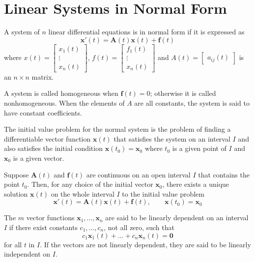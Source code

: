 \documentclass[../diffeq.tex]{subfiles}
\begin{document}
\section{Linear Systems in Normal Form}
A system of $n$ linear differential equations is in normal form if it is expressed as 
\[ \textbf{x}'(t)=\textbf{A}(t)\textbf{x}(t)+\textbf{f}(t) \]
where $x(t) = \begin{bmatrix}
    x_1(t)\\\vdots\\x_n(t)
\end{bmatrix}$, $f(t)=\begin{bmatrix}
    f_1(t)\\\vdots\\x_n(t)
\end{bmatrix}$ and $A(t)=\begin{bmatrix}
    a_{ij}(t)
\end{bmatrix}$ is an $n\times n$ matrix.

A system is called homogeneous when $\textbf{f}(t)=0$; otherwise it is called nonhomogeneous. When the elements of $A$ are all constants, the system is said to have constant coefficients.

The initial value problem for the normal system is the problem of finding a differentiable vector function $\textbf{x}(t)$ that satisfies the system on an interval $I$ and also satisfies the initial condition $\textbf{x}(t_0)=\textbf{x}_0$ where $t_0$ is a given point of $I$ and $\textbf{x}_0$ is a given vector.
\begin{theorem}
    Suppose $\textbf{A}(t)$ and $\textbf{f}(t)$ are continuous on an open interval $I$ that contains the point $t_0$. Then, for any choice of the initial vector $\textbf{x}_0$, there exists a unique solution $\textbf{x}(t)$ on the whole interval $I$ to the initial value problem 
    \[ \textbf{x}'(t)=\textbf{A}(t)\textbf{x}(t)+\textbf{f}(t), \qquad \textbf{x}(t_0)=\textbf{x}_0 \]
\end{theorem}

\begin{definition}
    The $m$ vector functions $\textbf{x}_1,\dots,\textbf{x}_n$ are said to be linearly dependent on an interval $I$ if there exist constants $c_1,\dots, c_n$, not all zero, such that 
    \[ c_1\textbf{x}_1(t)+ \dots + c_n\textbf{x}_n(t) =\textbf{0}\]
    for all $t$ in $I$. If the vectors are not linearly dependent, they are said to be linearly independent on $I$.
\end{definition}
\end{document}
